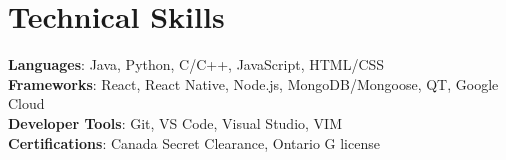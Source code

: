 \documentclass[letterpaper,11pt]{article}
\begin{document}
\section{Technical Skills}
 \begin{itemize}[leftmargin=0.15in, label={}]
    \small{\item{
     \textbf{Languages}{:  Java, Python, C/C++, JavaScript, HTML/CSS} \\
     \textbf{Frameworks}{: React, React Native, Node.js, MongoDB/Mongoose, QT, Google Cloud} \\
     \textbf{Developer Tools}{: Git, VS Code, Visual Studio, VIM} \\
     \textbf{Certifications}{:  Canada Secret Clearance, Ontario G license}
    }}
 \end{itemize}



\end{document}
